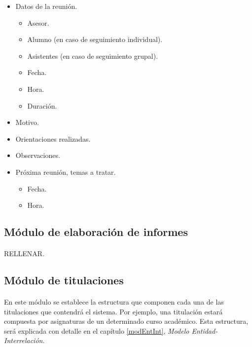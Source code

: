       \begin{itemize}
         \item Datos de la reunión.
         \begin{itemize}
            \item Asesor.
            \item Alumno (en caso de seguimiento individual).
            \item Asistentes (en caso de seguimiento grupal).
            \item Fecha.
            \item Hora.
            \item Duración.
         \end{itemize}
         \item Motivo.
         \item Orientaciones realizadas.
         \item Observaciones.
         \item Próxima reunión, temas a tratar.
         \begin{itemize}
            \item Fecha.
            \item Hora.
         \end{itemize}
      \end{itemize}

   \subsection{Módulo de elaboración de informes}

      \paragraph{}RELLENAR.

   \subsection{Módulo de titulaciones}

      \paragraph{}En este módulo se establece la estructura que componen
      cada una de las titulaciones que contendrá el sistema. Por ejemplo,
      una titulación estará compuesta por asignaturas de un determinado
      curso académico. Esta estructura, será explicada con detalle en el
      capítulo \ref{modEntInt}, \textit{Modelo Entidad-Interrelación}.

